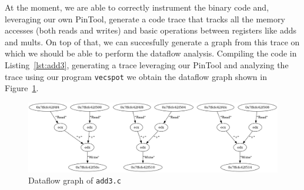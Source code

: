 \documentclass[acmsmall,review, nonacm]{acmart}
\begin{document}
At the moment, we are able to correctly instrument the binary code and, leveraging our own PinTool, generate 
a code trace that tracks all the memory accesses (both reads and writes) and basic operations between registers like adds and mults.
On top of that, we can succesfully generate a graph from this trace on which we should be able to perform the dataflow analysis. 
Compiling the code in Listing~\ref{lst:add3}, generating a trace leveraging our 
PinTool and analyzing the trace using our program \texttt{vecspot} we obtain the 
dataflow graph shown in Figure~\ref{fig:add3_dataflow}.



\begin{figure}[h!]
  \includegraphics[width=0.9\linewidth]{img/add3.png}
  \caption{Dataflow graph of \texttt{add3.c}}
  \label{fig:add3_dataflow}
\end{figure}












\end{document}
